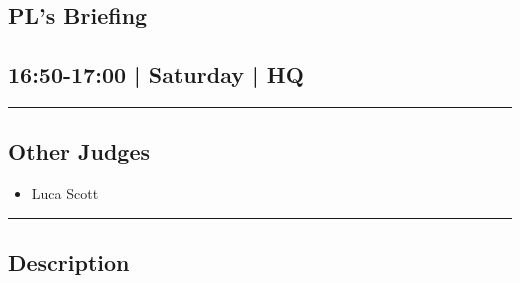 \documentclass[10pt, A5]{article}
\begin{document}
		\begin{framed}
			\begin{minipage}{\textwidth}

			\setcounter{section}{61}
							\section{PL's Briefing}
						
			\subsection*{16:50-17:00 | Saturday | HQ}

			\vspace{0.25cm}
			\hrule
			\vspace{0.25cm}


			\subsection*{Other Judges}
							

				\begin{multicols}{2}

			\begin{itemize}
											\item Luca Scott
								\end{itemize}

			\vfill\null
			\columnbreak

			\begin{itemize}
								\end{itemize}

			\vfill\null

			\end{multicols}

			\vspace{0.25cm}
			\hrule
			\vspace{0.25cm}

			\begin{minipage}{\textwidth}
			\subsection*{\faListAlt \: Description}
			
			\end{minipage}


	\end{minipage}
	\end{framed}

	
\end{document}
